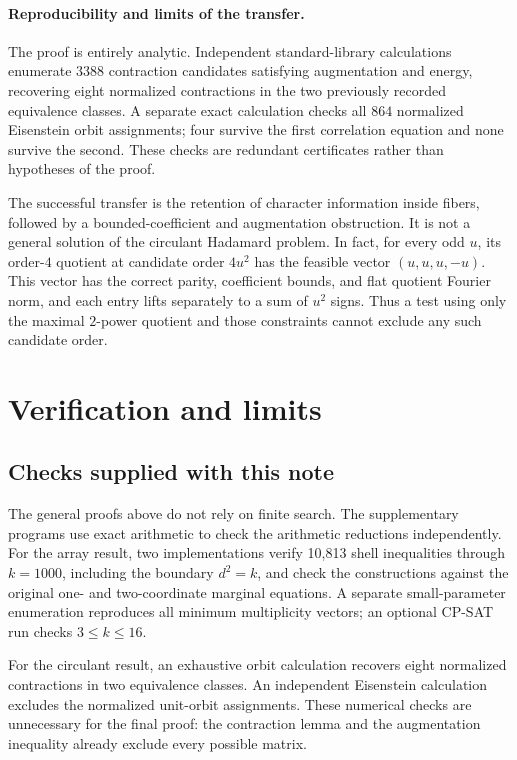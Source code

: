 \documentclass[11pt]{article}
\theoremstyle{remark}
\numberwithin{equation}{section}
\begin{document}
\paragraph{Reproducibility and limits of the transfer.}
The proof is entirely analytic. Independent standard-library calculations
enumerate $3388$ contraction candidates satisfying augmentation and energy,
recovering eight normalized contractions in the two previously recorded
equivalence classes. A separate exact calculation checks all $864$ normalized
Eisenstein orbit assignments; four survive the first correlation equation
and none survive the second. These checks are redundant certificates rather
than hypotheses of the proof.

The successful transfer is the retention of character information inside
fibers, followed by a bounded-coefficient and augmentation obstruction.
It is not a general solution of the circulant Hadamard problem. In fact, for
every odd $u$, its order-$4$ quotient at candidate order $4u^2$ has the
feasible vector $(u,u,u,-u)$. This vector has the correct parity, coefficient
bounds, and flat quotient Fourier norm, and each entry lifts separately to
a sum of $u^2$ signs. Thus a test using only the maximal $2$-power quotient
and those constraints cannot exclude any such candidate order.

\section{Verification and limits}

\subsection{Checks supplied with this note}
The general proofs above do not rely on finite search. The supplementary
programs use exact arithmetic to check the arithmetic reductions independently.
For the array result, two implementations verify 10,813 shell inequalities
through $k=1000$, including the boundary $d^2=k$, and check the constructions
against the original one- and two-coordinate marginal equations. A separate
small-parameter enumeration reproduces all minimum multiplicity vectors;
an optional CP-SAT run checks $3\le k\le16$.

For the circulant result, an exhaustive orbit calculation recovers eight
normalized contractions in two equivalence classes. An independent
Eisenstein calculation excludes the normalized unit-orbit assignments.
These numerical checks are unnecessary for the final proof: the contraction
lemma and the augmentation inequality already exclude every possible matrix.
\end{document}
